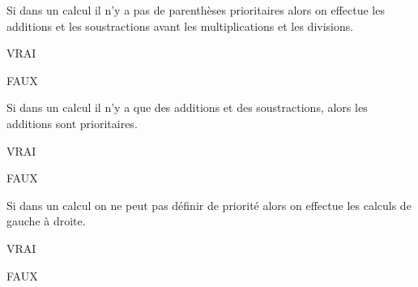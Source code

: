 \begin{QCM}
\begin{GroupeQCM}
\begin{exercice}
      Si dans un calcul il n'y a pas de parenthèses prioritaires alors on effectue les additions et les soustractions avant les multiplications et les divisions.
      \begin{ChoixQCM}{4}
      \item VRAI
      \item FAUX
      \end{ChoixQCM}
\begin{corrige}
   \end{corrige}
    \end{exercice}
  

\end{GroupeQCM}
\end{QCM}



\begin{QCM}
  \begin{GroupeQCM}
  
\begin{exercice}
      Si dans un calcul il n'y a que des additions et des soustractions, alors les additions sont prioritaires.
      \begin{ChoixQCM}{4}
      \item VRAI
      \item FAUX
      \end{ChoixQCM}
\begin{corrige}
   \end{corrige}
    \end{exercice}
    
\begin{exercice}
      Si dans un calcul on ne peut pas définir de priorité alors on effectue les calculs de gauche à droite.
      \begin{ChoixQCM}{4}
      \item VRAI
      \item FAUX
      \end{ChoixQCM}
\begin{corrige}
   \end{corrige}
    \end{exercice}

\end{GroupeQCM}
\end{QCM}

  
